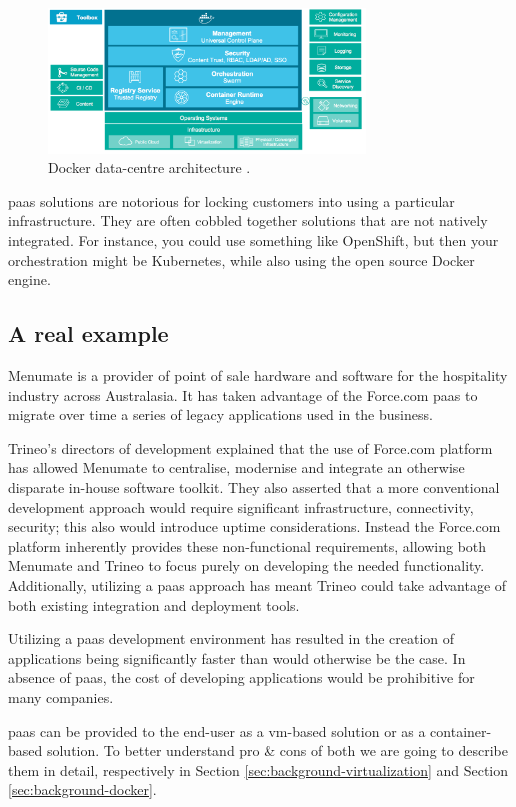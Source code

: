 \begin{figure}
	\centering{}
	\includegraphics[width=0.75\textwidth]{chapters/background/images/docker-datacentre.png}
	\caption[Docker data-centre architecture]{Docker data-centre architecture \cite{dockerDataCentreArchitecture}.}
	\label{img:background-cloudPlatform-dockerDataCetre}
\end{figure}

\ac{paas} solutions are notorious for locking customers into using a particular infrastructure. They
are often cobbled together solutions that are not natively integrated. For instance, you could use
something like OpenShift, but then your orchestration might be Kubernetes, while also using the open
source Docker engine.

\subsection{A real example}
\label{sec:background-paas-realExample}
Menumate \cite{menumateCaseStudy} is a provider of point of sale hardware and software for the hospitality
industry across Australasia. It has taken advantage of the Force.com \ac{paas} to migrate over time a
series of legacy applications used in the business.

Trineo's \cite{trineoCaseStudy} directors of development explained that the use of Force.com platform has
allowed Menumate to centralise, modernise and integrate an otherwise disparate in-house software toolkit. 
They also asserted that a more conventional development approach would require significant infrastructure,
connectivity, security; this also would introduce uptime considerations. Instead the Force.com
platform inherently provides these non-functional requirements, allowing both Menumate and Trineo to
focus purely on developing the needed functionality. Additionally, utilizing a \ac{paas} approach
has meant Trineo could take advantage of both existing integration and deployment tools.

Utilizing a \ac{paas} development environment has resulted in the creation of applications being
significantly faster than would otherwise be the case. In absence of \ac{paas}, the cost of developing
applications would be prohibitive for many companies.

\ac{paas} can be provided to the end-user as a \ac{vm}-based solution or as a container-based solution. To 
better understand pro \& cons of both we are going to describe them in detail, respectively in Section
\ref{sec:background-virtualization} and Section \ref{sec:background-docker}.